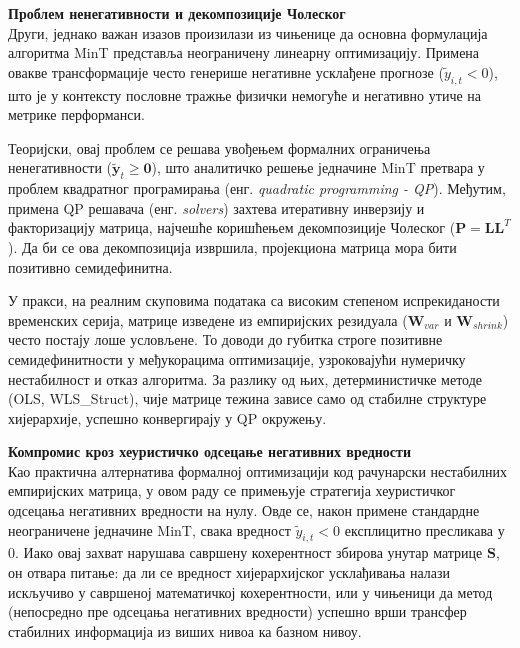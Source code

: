 \documentclass[12pt,oneside]{memoir}
\begin{document}
\vspace{1em}
\noindent \textbf{Проблем ненегативности и декомпозиције Чолеског} \\
Други, једнако важан изазов произилази из чињенице да основна формулација алгоритма MinT представља неограничену линеарну оптимизацију. Примена овакве трансформације често генерише негативне усклађене прогнозе ($\tilde{y}_{i,t} < 0$), што је у контексту пословне тражње физички немогуће и негативно утиче на метрике перформанси.

Теоријски, овај проблем се решава увођењем формалних ограничења ненегативности ($\tilde{\mathbf{y}}_t \ge \mathbf{0}$), што аналитичко решење једначине MinT претвара у проблем квадратног програмирања (енг. \textit{quadratic programming - QP}). Међутим, примена QP решавача (енг. \textit{solvers}) захтева итеративну инверзију и факторизацију матрица, најчешће коришћењем декомпозиције Чолеског ($\mathbf{P} = \mathbf{L} \mathbf{L}^T$). Да би се ова декомпозиција извршила, пројекциона матрица мора бити позитивно семидефинитна.

У пракси, на реалним скуповима података са високим степеном испрекиданости временских серија, матрице изведене из емпиријских резидуала ($\mathbf{W}_{var}$ и $\mathbf{W}_{shrink}$) често постају лоше условљене. То доводи до губитка строге позитивне семидефинитности у међукорацима оптимизације, узроковајући нумеричку нестабилност и отказ алгоритма. За разлику од њих, детерминистичке методе (OLS, WLS\_Struct), чије матрице тежина зависе само од стабилне структуре хијерархије, успешно конвергирају у QP окружењу.

\vspace{1em}
\noindent \textbf{Компромис кроз хеуристичко одсецање негативних вредности} \\
Као практична алтернатива формалној оптимизацији код рачунарски нестабилних емпиријских матрица, у овом раду се примењује стратегија хеуристичког одсецања негативних вредности на нулу. Овде се, након примене стандардне неограничене једначине MinT, свака вредност $\tilde{y}_{i,t} < 0$ експлицитно пресликава у $0$. Иако овај захват нарушава савршену кохерентност збирова унутар матрице $\mathbf{S}$, он отвара питање: да ли се вредност хијерархијског усклађивања налази искључиво у савршеној математичкој кохерентности, или у чињеници да метод (непосредно пре одсецања негативних вредности) успешно врши трансфер стабилних информација из виших нивоа ка базном нивоу.


\end{document}
